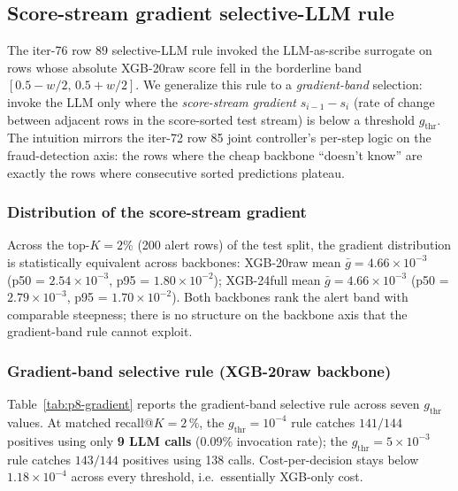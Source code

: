 \subsection{Score-stream gradient selective-LLM rule}
\label{sec:p8-gradient-selective}

The iter-76 row 89 selective-LLM rule invoked the LLM-as-scribe surrogate
on rows whose absolute XGB-20raw score fell in the borderline band
$[0.5 - w/2,\, 0.5 + w/2]$. We generalize this rule to a \emph{gradient-band}
selection: invoke the LLM only where the \emph{score-stream gradient}
$s_{i-1} - s_i$ (rate of change between adjacent rows in the score-sorted
test stream) is below a threshold $g_{\mathrm{thr}}$. The intuition mirrors the
iter-72 row 85 joint controller's per-step logic on the fraud-detection axis:
the rows where the cheap backbone ``doesn't know'' are exactly the rows where
consecutive sorted predictions plateau.

\subsubsection{Distribution of the score-stream gradient}
Across the top-$K=2\%$ (200 alert rows) of the test split, the gradient
distribution is statistically equivalent across backbones:
XGB-20raw mean $\bar{g}=4.66 \times 10^{-3}$ (p50 = $2.54 \times 10^{-3}$,
p95 = $1.80 \times 10^{-2}$); XGB-24full mean $\bar{g}=4.66 \times 10^{-3}$
(p50 = $2.79 \times 10^{-3}$, p95 = $1.70 \times 10^{-2}$). Both backbones
rank the alert band with comparable steepness; there is no structure on the
backbone axis that the gradient-band rule cannot exploit.

\subsubsection{Gradient-band selective rule (XGB-20raw backbone)}
\label{sec:p8-gradient-rule}
Table~\ref{tab:p8-gradient} reports the gradient-band selective rule across
seven $g_{\mathrm{thr}}$ values. At matched recall@$K{=}2\,\%$, the
$g_{\mathrm{thr}}{=}10^{-4}$ rule catches $141/144$ positives using only
\textbf{9 LLM calls} (0.09\% invocation rate); the
$g_{\mathrm{thr}}{=}5 \times 10^{-3}$ rule catches $143/144$ positives using
138 calls. Cost-per-decision stays below $1.18 \times 10^{-4}$ across every
threshold, i.e.\ essentially XGB-only cost.


